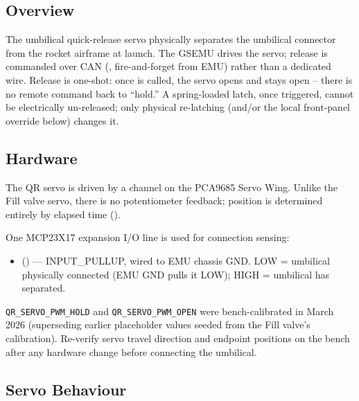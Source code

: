 ﻿\documentclass[11pt,letterpaper]{article}
\begin{document}
\subsection{Overview}

\begin{sloppypar}
The umbilical quick-release servo physically separates the umbilical
connector from the rocket airframe at launch. The GSEMU drives the servo;
release is commanded over CAN (, fire-and-forget from
EMU) rather than a dedicated wire. Release is one-shot: once
 is called, the servo opens and stays open -- there
is no remote command back to ``hold.'' A spring-loaded latch, once
triggered, cannot be electrically un-released; only physical re-latching
(and/or the local front-panel override below) changes it.
\end{sloppypar}

\subsection{Hardware}

The QR servo is driven by a channel on the PCA9685 Servo Wing. Unlike the
Fill valve servo, there is no potentiometer feedback; position is determined
entirely by elapsed time ().

One MCP23X17 expansion I/O line is used for connection sensing:

\begin{itemize}[nosep]
  \item {} () --- INPUT\_PULLUP, wired to
        EMU chassis GND. LOW = umbilical physically connected (EMU GND
        pulls it LOW); HIGH = umbilical has separated.
\end{itemize}

\begin{warningbox}
\texttt{QR\_SERVO\_PWM\_HOLD} and \texttt{QR\_SERVO\_PWM\_OPEN} were
bench-calibrated in March 2026 (superseding earlier placeholder values
seeded from the Fill valve's calibration). Re-verify servo travel
direction and endpoint positions on the bench after any hardware change
before connecting the umbilical.
\end{warningbox}

\subsection{Servo Behaviour}
\end{document}
